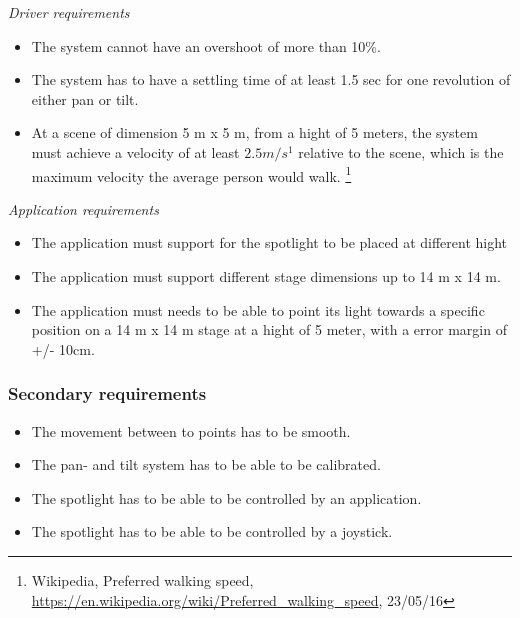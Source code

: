 \textit{Driver requirements}
\begin{itemize}
\item The system cannot have an overshoot of more than 10\%.

\item The system has to have a settling time of at least 1.5 sec for one revolution of either pan or tilt.	

\item At a scene of dimension 5 m x 5 m, from a hight of 5 meters, the system must achieve a velocity of at least $2.5 m/s^{1}$ relative to the scene, which is the maximum velocity the average person would walk. 
\footnote{Wikipedia, Preferred walking speed, \url{https://en.wikipedia.org/wiki/Preferred_walking_speed}, 23/05/16}

\end{itemize}


\textit{Application requirements}
\begin{itemize}


\item The application must support for the spotlight to be placed at different hight

\item The application must support different stage dimensions up to 14 m x 14 m. 

\item The application must needs to be able to point its light towards a specific position on a 14 m x 14 m stage at a hight of 5 meter, with a error margin of +/- 10cm. 
\end{itemize}


\subsubsection{Secondary requirements}
\begin{itemize}
\item The movement between to points has to be smooth.

\item The pan- and tilt system has to be able to be calibrated.

\item The spotlight has to be able to be controlled by an application.

\item The spotlight has to be able to be controlled by a joystick.
\end{itemize}
